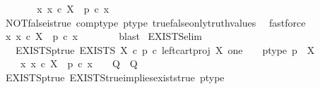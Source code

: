 \begin{isabellebody}
\ \ \isamarkupfalse%
\ \isamarkupfalse%
\ {\isachardoublequoteopen}{\isasymnot}\ {\isacharparenleft}{\kern0pt}{\isasymforall}\ x{\isachardot}{\kern0pt}\ x\ {\isasymin}\isactrlsub c\ X\ {\isasymlongrightarrow}\ p\ {\isasymcirc}\isactrlsub c\ x\ {\isasymnoteq}\ {\isasymt}{\isacharparenright}{\kern0pt}{\isachardoublequoteclose}\isanewline
\ \ \ \ \isamarkupfalse%
\ NOT{\isacharunderscore}{\kern0pt}false{\isacharunderscore}{\kern0pt}is{\isacharunderscore}{\kern0pt}true\ comp{\isacharunderscore}{\kern0pt}type\ p{\isacharunderscore}{\kern0pt}type\ true{\isacharunderscore}{\kern0pt}false{\isacharunderscore}{\kern0pt}only{\isacharunderscore}{\kern0pt}truth{\isacharunderscore}{\kern0pt}values\ \isamarkupfalse%
\ fastforce\isanewline
\ \ \isamarkupfalse%
\ \isamarkupfalse%
\ {\isachardoublequoteopen}{\isasymexists}x{\isachardot}{\kern0pt}\ x\ {\isasymin}\isactrlsub c\ X\ {\isasymand}\ p\ {\isasymcirc}\isactrlsub c\ x\ {\isacharequal}{\kern0pt}\ {\isasymt}{\isachardoublequoteclose}\isanewline
\ \ \ \ \isamarkupfalse%
\ blast\isanewline
{}\isamarkupfalse%
%
\endisatagproof
{\isafoldproof}%
%
\isadelimproof
\isanewline
%
\endisadelimproof
\isanewline
{}\isamarkupfalse%
\ EXISTS{\isacharunderscore}{\kern0pt}elim{\isacharcolon}{\kern0pt}\isanewline
\ \ \ EXISTS{\isacharunderscore}{\kern0pt}p{\isacharunderscore}{\kern0pt}true{\isacharcolon}{\kern0pt}\ {\isachardoublequoteopen}EXISTS\ X\ {\isasymcirc}\isactrlsub c\ {\isacharparenleft}{\kern0pt}p\ {\isasymcirc}\isactrlsub c\ left{\isacharunderscore}{\kern0pt}cart{\isacharunderscore}{\kern0pt}proj\ X\ one{\isacharparenright}{\kern0pt}\isactrlsup {\isasymsharp}\ {\isacharequal}{\kern0pt}\ {\isasymt}{\isachardoublequoteclose}\ \ p{\isacharunderscore}{\kern0pt}type{\isacharcolon}{\kern0pt}\ {\isachardoublequoteopen}p\ {\isacharcolon}{\kern0pt}\ X\ {\isasymrightarrow}\ {\isasymOmega}{\isachardoublequoteclose}\isanewline
\ \ \ {\isachardoublequoteopen}{\isacharparenleft}{\kern0pt}{\isasymAnd}\ x{\isachardot}{\kern0pt}\ x\ {\isasymin}\isactrlsub c\ X\ {\isasymLongrightarrow}\ p\ {\isasymcirc}\isactrlsub c\ x\ {\isacharequal}{\kern0pt}\ {\isasymt}\ {\isasymLongrightarrow}\ Q{\isacharparenright}{\kern0pt}\ {\isasymLongrightarrow}\ Q{\isachardoublequoteclose}\isanewline
%
\isadelimproof
\ \ %
\endisadelimproof
%
\isatagproof
{}\isamarkupfalse%
\ EXISTS{\isacharunderscore}{\kern0pt}p{\isacharunderscore}{\kern0pt}true\ EXISTS{\isacharunderscore}{\kern0pt}true{\isacharunderscore}{\kern0pt}implies{\isacharunderscore}{\kern0pt}exists{\isacharunderscore}{\kern0pt}true\ p{\isacharunderscore}{\kern0pt}type\ \isamarkupfalse%

\end{isabellebody}

